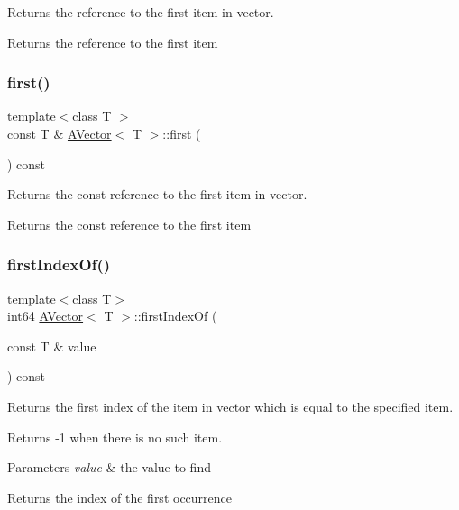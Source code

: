Returns the reference to the first item in vector. 

\begin{DoxyReturn}{Returns}
the reference to the first item 
\end{DoxyReturn}
\mbox{\label{class_a_vector_a960abfbaf4b7b395286c82d79571147a}} 
\subsubsection{\texorpdfstring{first()}{first()}\hspace{0.1cm}{\footnotesize\ttfamily [2/2]}}
{\footnotesize\ttfamily template$<$class T $>$ \\
const T \& \mbox{\hyperlink{class_a_vector}{A\+Vector}}$<$ T $>$\+::first (\begin{DoxyParamCaption}{ }\end{DoxyParamCaption}) const}



Returns the const reference to the first item in vector. 

\begin{DoxyReturn}{Returns}
the const reference to the first item 
\end{DoxyReturn}
\mbox{\label{class_a_vector_a708d011b518ee295e0c940ee5081871a}} 
\subsubsection{\texorpdfstring{firstIndexOf()}{firstIndexOf()}}
{\footnotesize\ttfamily template$<$class T$>$ \\
int64 \mbox{\hyperlink{class_a_vector}{A\+Vector}}$<$ T $>$\+::first\+Index\+Of (\begin{DoxyParamCaption}\item[{const T \&}]{value }\end{DoxyParamCaption}) const}



Returns the first index of the item in vector which is equal to the specified item. 

Returns -\/1 when there is no such item.


\begin{DoxyParams}{Parameters}
{\em value} & the value to find \\
\hline
\end{DoxyParams}
\begin{DoxyReturn}{Returns}
the index of the first occurrence 
\end{DoxyReturn}
\mbox{\label{class_a_vector_ab58a7db547c5381ed4b8d25163c1a576}} 
